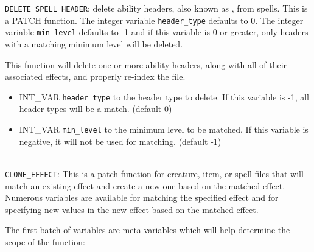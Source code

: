\documentclass{article}
\begin{document}
\verb+DELETE_SPELL_HEADER+: delete ability headers, also known as , from spells. This is a PATCH function. The integer variable \verb+header_type+ defaults to 0. The integer variable \verb+min_level+ defaults to -1 and if this variable is 0 or greater, only headers with a matching minimum level will be deleted.

This function will delete one or more ability headers, along with all of their associated effects, and properly re-index the file.

\begin{itemize}
\item INT_VAR \verb+header_type+ to the header type to delete. If this variable is -1, all header types will be a match. (default 0)
\item INT_VAR \verb+min_level+ to the minimum level to be matched. If this variable is negative, it will not be used for matching. (default -1)
\end{itemize}
\\

\verb+CLONE_EFFECT+: This is a patch function for creature, item, or spell files that will match an existing effect and create a new one based on the matched effect. Numerous variables are available for matching the specified effect and for specifying new values in the new effect based on the matched effect.

The first batch of variables are meta-variables which will help determine the scope of the function:
\end{document}
